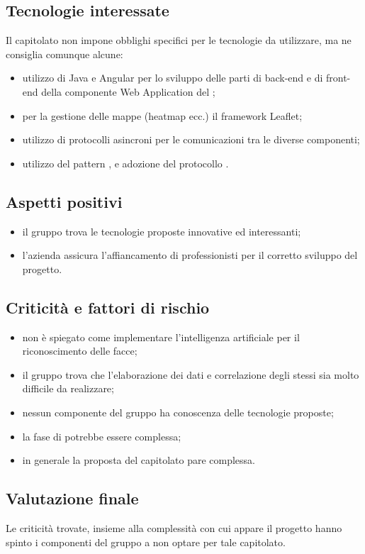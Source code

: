 \subsection{Tecnologie interessate}
Il capitolato non impone obblighi specifici per le tecnologie da utilizzare, ma ne consiglia comunque alcune:
\begin{itemize}
\item utilizzo di Java e Angular per lo sviluppo delle parti di back-end e di front-end della componente Web
Application del ;
\item per la gestione delle mappe (heatmap ecc.) il framework Leaflet;
\item utilizzo di protocolli asincroni per le comunicazioni tra le diverse componenti;
\item utilizzo del pattern , e adozione del protocollo .
\end{itemize}

\subsection{Aspetti positivi}
\begin{itemize}
\item il gruppo trova le tecnologie proposte innovative ed interessanti;
\item l'azienda assicura l'affiancamento di professionisti per il corretto sviluppo del progetto.
\end{itemize}

\subsection{Criticità e fattori di rischio}
\begin{itemize}
\item non è spiegato come implementare l'intelligenza artificiale per il riconoscimento delle facce;
\item il gruppo trova che l'elaborazione dei dati e correlazione degli stessi sia molto difficile da realizzare;
\item nessun componente del gruppo ha conoscenza delle tecnologie proposte;
\item la fase di  potrebbe essere complessa;
\item in generale la proposta del capitolato pare complessa.
\end{itemize}

\subsection{Valutazione finale}
Le criticità trovate, insieme alla complessità con cui appare il progetto hanno spinto i componenti del gruppo a non optare per tale capitolato.
